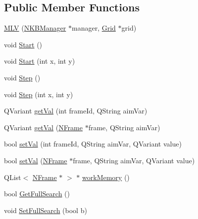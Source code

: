 \subsection*{Public Member Functions}
\begin{DoxyCompactItemize}
\item 
\hyperlink{class_m_l_v_a00e537a60a93ef2df30db4632f5b0fc1}{MLV} (\hyperlink{class_n_k_b_manager}{NKBManager} $\ast$manager, \hyperlink{class_grid}{Grid} $\ast$grid)
\item 
void \hyperlink{class_m_l_v_ac6ae024c5256ee5be3721108ecb13b59}{Start} ()
\item 
void \hyperlink{class_m_l_v_abd6c51ddb9c23a1419aee7f68db5fbb2}{Start} (int x, int y)
\item 
void \hyperlink{class_m_l_v_afde1bf4d974d5aeb86f0d70fac9757fa}{Step} ()
\item 
void \hyperlink{class_m_l_v_a9bf03c54d62c00104993d26b0922cf5a}{Step} (int x, int y)
\item 
QVariant \hyperlink{class_m_l_v_aff1d66bd065183aee229698081e03524}{getVal} (int frameId, QString aimVar)
\item 
QVariant \hyperlink{class_m_l_v_abd54e1ef65e77c83a551e0aa619e07b9}{getVal} (\hyperlink{class_n_frame}{NFrame} $\ast$frame, QString aimVar)
\item 
bool \hyperlink{class_m_l_v_a696b73cf6e6aa87e48d1d556fa1ada10}{setVal} (int frameId, QString aimVar, QVariant value)
\item 
bool \hyperlink{class_m_l_v_a89e4da36393f346d0d4f1c21d56856d6}{setVal} (\hyperlink{class_n_frame}{NFrame} $\ast$frame, QString aimVar, QVariant value)
\item 
QList$<$ \hyperlink{class_n_frame}{NFrame} $\ast$ $>$ $\ast$ \hyperlink{class_m_l_v_aaefc0b7c6db1be8906a8304edb824aa3}{workMemory} ()
\item 
bool \hyperlink{class_m_l_v_a14d57e9d10b63b915eabdcc86d2223ff}{GetFullSearch} ()
\item 
void \hyperlink{class_m_l_v_ae7a3cc47774da9ccd7e8793e0fc78d8e}{SetFullSearch} (bool b)
\end{DoxyCompactItemize}
